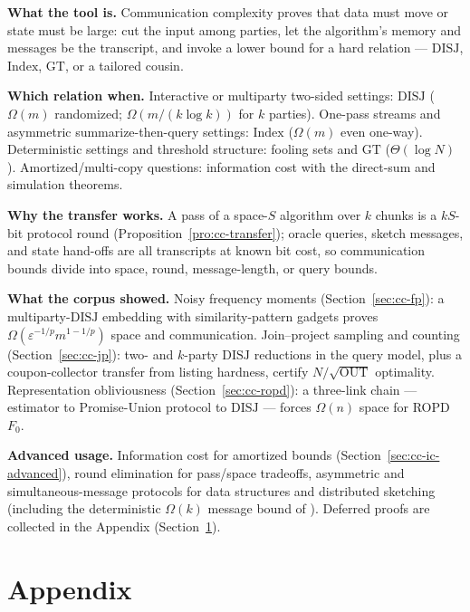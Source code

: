 \begin{recap}
\item \textbf{What the tool is.} Communication complexity proves that data must move
  or state must be large: cut the input among parties, let the algorithm's memory
  and messages be the transcript, and invoke a lower bound for a hard relation ---
  $\mathrm{DISJ}$, $\mathrm{Index}$, $\mathrm{GT}$, or a tailored cousin.
\item \textbf{Which relation when.} Interactive or multiparty two-sided settings:
  $\mathrm{DISJ}$ ($\Omega(m)$ randomized; $\Omega(m/(k\log k))$ for $k$ parties).
  One-pass streams and asymmetric summarize-then-query settings: $\mathrm{Index}$
  ($\Omega(m)$ even one-way). Deterministic settings and threshold structure:
  fooling sets and $\mathrm{GT}$ ($\Theta(\log N)$). Amortized/multi-copy
  questions: information cost with the direct-sum and simulation theorems.
\item \textbf{Why the transfer works.} A pass of a space-$S$ algorithm over $k$
  chunks is a $kS$-bit protocol round (Proposition~\ref{pro:cc-transfer}); oracle
  queries, sketch messages, and state hand-offs are all transcripts at known bit
  cost, so communication bounds divide into space, round, message-length, or query
  bounds.
\item \textbf{What the corpus showed.} Noisy frequency moments
  (Section~\ref{sec:cc-fp}): a multiparty-$\mathrm{DISJ}$ embedding with
  similarity-pattern gadgets proves $\Omega(\varepsilon^{-1/p} m^{1-1/p})$ space and
  communication. Join--project sampling and counting (Section~\ref{sec:cc-jp}):
  two- and $k$-party $\mathrm{DISJ}$ reductions in the query model, plus a
  coupon-collector transfer from listing hardness, certify
  $N/\sqrt{\mathrm{OUT}}$ optimality. Representation obliviousness
  (Section~\ref{sec:cc-ropd}): a three-link chain --- estimator to Promise-Union
  protocol to $\mathrm{DISJ}$ --- forces $\Omega(n)$ space for ROPD $F_0$.
\item \textbf{Advanced usage.} Information cost for amortized bounds
  (Section~\ref{sec:cc-ic-advanced}), round elimination for pass/space tradeoffs,
  asymmetric and simultaneous-message protocols for data structures and distributed
  sketching (including the deterministic $\Omega(k)$ message bound of
  \citep{sigmod26-070}). Deferred proofs are collected in the
  Appendix (Section~\ref{sec:cc-appendix}).
\end{recap}

\section{Appendix}
\label{sec:cc-appendix}

